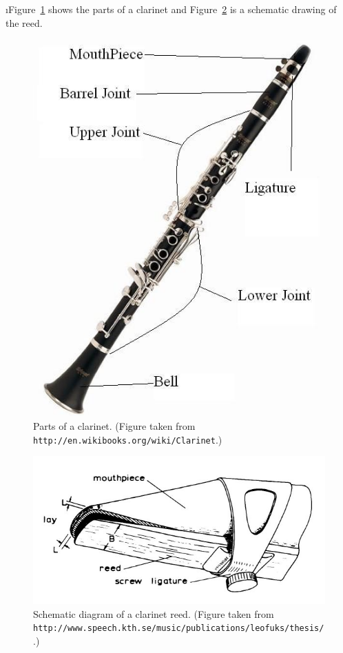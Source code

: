 \i Figure~\ref{f:clarinet} shows the parts of a clarinet
and Figure~\ref{f:reed-schematic} is a schematic
drawing of the reed.
%
\begin{figure}[htbp]
\begin{center}
\includegraphics[height=.5\textheight]{clarinet.jpg}
\caption{Parts of a clarinet.
(Figure taken from {\tt http://en.wikibooks.org/wiki/Clarinet}.)}
\label{f:clarinet}
\end{center}
\end{figure}
%
\begin{figure}[htbp]
\begin{center}
\includegraphics[width=.4\textwidth]{reed-schematic.jpg}
\caption{Schematic diagram of a clarinet reed.
(Figure taken from 
{\tt http://www.speech.kth.se/music/publications/leofuks/thesis/}.)}
\label{f:reed-schematic}
\end{center}
\end{figure}

